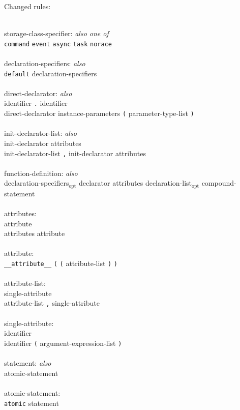\documentclass[11pt,letterpaper]{article}
\newcommand{\kw}[1]{{\tt #1}}
\newcommand{\opt}{$_{\mbox{opt}}$\xspace}
\newcommand{\grammarindent}{\hspace*{2cm}\= \\ \kill}
\begin{document}
Changed rules: 
\em \begin{tabbing}
\grammarindent
storage-class-specifier: \emph{also one of}\\
\>	\kw{command} \kw{event} \kw{async} \kw{task} \kw{norace}\\
\\
declaration-specifiers: \emph{also}\\
\>	\kw{default} declaration-specifiers\\
\\
direct-declarator: \emph{also}\\
\>	identifier \kw{.} identifier \\
\>	direct-declarator instance-parameters \kw{(} parameter-type-list \kw{)}\\
\\
init-declarator-list: \emph{also}\\
\>	init-declarator attributes\\
\>	init-declarator-list \kw{,} init-declarator attributes\\
\\
function-definition: \emph{also}\\
\>	declaration-specifiers\opt declarator attributes declaration-list\opt compound-statement\\
\\
attributes:\\
\>	attribute\\
\>	attributes attribute\\
\\
attribute:\\
\>	\kw{\_\_attribute\_\_} \kw{(} \kw{(} attribute-list \kw{)} \kw{)}\\
\\
attribute-list:\\
\>	single-attribute\\
\>	attribute-list \kw{,} single-attribute\\
\\
single-attribute:\\
\>	identifier\\
\>	identifier \kw{(} argument-expression-list \kw{)}\\
\\
statement: \emph{also}\\
\>	atomic-statement\\
\\
atomic-statement:\\
\>	\kw{atomic} statement\\
\\

\end{tabbing}
\end{document}
